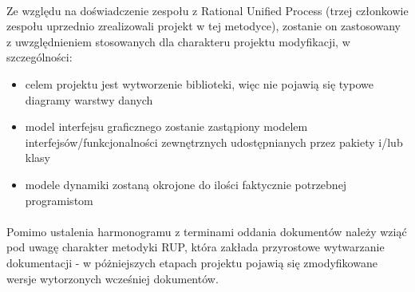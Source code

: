 \paragraph{} Ze względu na doświadczenie zespołu z Rational Unified Process (trzej członkowie zespołu uprzednio zrealizowali projekt w tej metodyce), zostanie on zastosowany z uwzględnieniem stosowanych dla charakteru projektu modyfikacji, w szczególności:
\begin{itemize}
 \item celem projektu jest wytworzenie biblioteki, więc nie pojawią się typowe diagramy warstwy danych
\item model interfejsu graficznego zostanie zastąpiony modelem interfejsów/funkcjonalności zewnętrznych udostępnianych przez pakiety i/lub klasy
\item modele dynamiki zostaną okrojone do ilości faktycznie potrzebnej programistom
\end{itemize}
\paragraph{}Pomimo ustalenia harmonogramu z terminami oddania dokumentów należy wziąć pod uwagę charakter metodyki RUP, która zakłada przyrostowe wytwarzanie dokumentacji - w póżniejszych etapach projektu pojawią się zmodyfikowane wersje wytorzonych wcześniej dokumentów.

